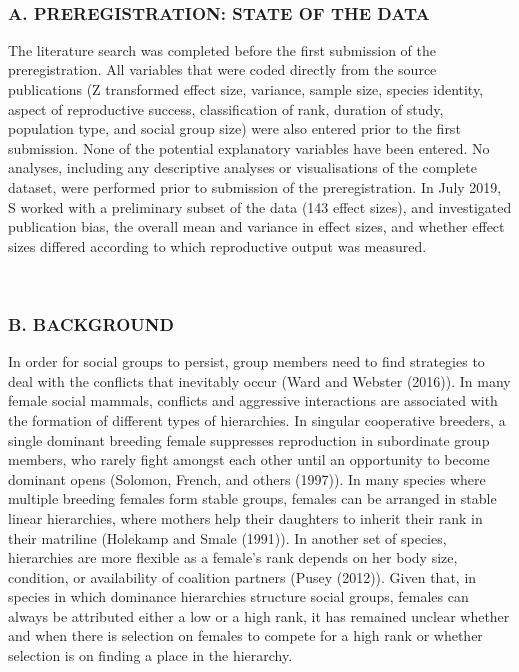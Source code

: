 \documentclass[]{article}
\begin{document}
~

\hypertarget{a.-preregistration-state-of-the-data}{%
\subsubsection{A. PREREGISTRATION: STATE OF THE
DATA}\label{a.-preregistration-state-of-the-data}}

The literature search was completed before the first submission of the
preregistration. All variables that were coded directly from the source
publications (Z transformed effect size, variance, sample size, species
identity, aspect of reproductive success, classification of rank,
duration of study, population type, and social group size) were also
entered prior to the first submission. None of the potential explanatory
variables have been entered. No analyses, including any descriptive
analyses or visualisations of the complete dataset, were performed prior
to submission of the preregistration. In July 2019, S worked with a
preliminary subset of the data (143 effect sizes), and investigated
publication bias, the overall mean and variance in effect sizes, and
whether effect sizes differed according to which reproductive output was
measured.

~

\hypertarget{b.-background}{%
\subsubsection{B. BACKGROUND}\label{b.-background}}

In order for social groups to persist, group members need to find
strategies to deal with the conflicts that inevitably occur (Ward and
Webster (2016)). In many female social mammals, conflicts and aggressive
interactions are associated with the formation of different types of
hierarchies. In singular cooperative breeders, a single dominant
breeding female suppresses reproduction in subordinate group members,
who rarely fight amongst each other until an opportunity to become
dominant opens (Solomon, French, and others (1997)). In many species
where multiple breeding females form stable groups, females can be
arranged in stable linear hierarchies, where mothers help their
daughters to inherit their rank in their matriline (Holekamp and Smale
(1991)). In another set of species, hierarchies are more flexible as a
female's rank depends on her body size, condition, or availability of
coalition partners (Pusey (2012)). Given that, in species in which
dominance hierarchies structure social groups, females can always be
attributed either a low or a high rank, it has remained unclear whether
and when there is selection on females to compete for a high rank or
whether selection is on finding a place in the hierarchy.
\end{document}
